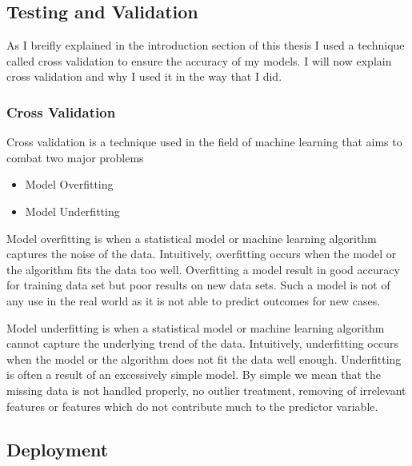 \subsection{Testing and Validation}
As I breifly explained in the introduction section of this thesis I used a technique called cross validation to ensure the accuracy of my models. I will now explain cross validation and why I used it in the way that I did.

\subsubsection{Cross Validation}
Cross validation is a technique used in the field of machine learning that aims to combat two major problems

\begin{itemize}
	\item Model Overfitting
	\item Model Underfitting
\end{itemize}
Model overfitting is when a statistical model or machine learning algorithm captures the noise of the data. Intuitively, overfitting occurs when the model or the algorithm fits the data too well.
Overfitting a model result in good accuracy for training data set but poor results on new data sets. Such a model is not of any use in the real world as it is not able to predict outcomes for new cases.

Model underfitting is when a statistical model or machine learning algorithm cannot capture the underlying trend of the data. Intuitively, underfitting occurs when the model or the algorithm does not fit the data well enough. Underfitting is often a result of an excessively simple model. By simple we mean that the missing data is not handled properly, no outlier treatment, removing of irrelevant features or features which do not contribute much to the predictor variable.

\subsection{Deployment}









